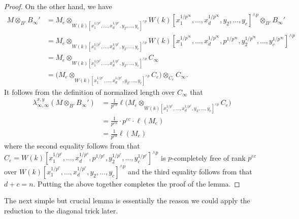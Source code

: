 \documentclass[12pt]{amsart}
\numberwithin{equation}{theorem}
\numberwithin{equation}{theorem}
\begin{document}
\begin{proof}
On the other hand, we have 
\begin{align*}
M \otimes_{B'}B_\infty' & = M_e \otimes_{W(k)[x_1^{1/p^e}, \dots,x_d^{1/p^e},y_2,\dots,y_c]^{\wedge p}}W(k)[x_1^{1/p^\infty}, \dots,x_d^{1/p^\infty},y_2,\dots,y_c]^{\wedge p} \otimes_{B'}B_\infty' \\
& = M_e \otimes_{W(k)[x_1^{1/p^e}, \dots,x_d^{1/p^e},y_2,\dots,y_c]^{\wedge p}}W(k)[x_1^{1/p^\infty}, \dots,x_d^{1/p^\infty},p^{1/p^\infty}, y_2^{1/p^\infty},\dots,y_c^{1/p^\infty}]^{\wedge p}\\
& =  M_e \otimes_{W(k)[x_1^{1/p^e}, \dots,x_d^{1/p^e},y_2,\dots,y_c]^{\wedge p}} C_\infty \\
& = \big(M_e \otimes_{W(k)[x_1^{1/p^e}, \dots,x_d^{1/p^e},y_2,\dots,y_c]^{\wedge p}} C_e\big)\otimes_{C_e}C_\infty.
\end{align*}
It follows from the definition of normalized length over $C_\infty$ that 
\begin{align*}
    \lambda_{\infty,\infty}^{\underline{x},\underline{y}}(M \otimes_{B'}B_\infty') & = \frac{1}{p^{en}} \ell\big(M_e \otimes_{W(k)[x_1^{1/p^e}, \dots,x_d^{1/p^e},y_2,\dots,y_c]^{\wedge p}} C_e\big) \\
    & = \frac{1}{p^{en}} \cdot p^{ec} \cdot \ell(M_e) \\
    & = \frac{1}{p^{ed}} \ell(M_e)
\end{align*}
where the second equality follows from that $C_e= W(k)[x_1^{1/p^e},\dots,x_d^{1/p^e},p^{1/p^e}, y_2^{1/p^e},\dots,y_c^{1/p^e}]^{\wedge p}$ is $p$-completely free of rank $p^{ec}$ over $W(k)[x_1^{1/p^e}, \dots,x_d^{1/p^e},y_2,\dots,y_c]^{\wedge p}$ and the third equality follows from that $d+c=n$. Putting the above together completes the proof of the lemma.
\end{proof}


The next simple but crucial lemma is essentially the reason we could apply the reduction to the diagonal trick later.
\end{document}
